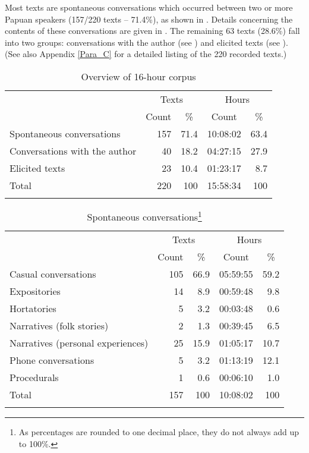 {Most texts are spontaneous conversations which occurred between two or more Papuan speakers (157/220 texts – 71.4\%), as shown in . Details concerning the contents of these conversations are given in . The remaining 63 texts (28.6\%) fall into two groups: conversations with the author (see ) and elicited texts (see ). (See also Appendix \ref{Para_C} for a detailed listing of the 220 recorded texts.)

\begin{table}[p]
\caption{Overview of 16-hour corpus}\label{Table_1.1.14}


\begin{tabular}{lrrrr}
\lsptoprule
 \multicolumn{1}{c}{Text types} & \multicolumn{2}{c}{Texts} & \multicolumn{2}{c}{Hours}\\\cmidrule(lr){2-3}\cmidrule(lr){4-5}
 & \multicolumn{1}{c}{Count} & \multicolumn{1}{c}{\%} & \multicolumn{1}{c}{Count} & \multicolumn{1}{c}{\%}\\
\midrule

Spontaneous conversations &  157 &  71.4 &  10:08:02 &  63.4\\
Conversations with the author &  40 &  18.2 &  04:27:15 &  27.9\\
Elicited texts &  23 &  10.4 &  01:23:17 &  8.7\\
\midrule
Total &  220 &  100 &  15:58:34 &  100\\

\lspbottomrule
\end{tabular}
\end{table}



\begin{table}[p]
\caption[Spontaneous conversations]{Spontaneous conversations\footnote{As percentages are rounded to one decimal place, they do not always add up to 100\%.}}\label{Table_1.15}

\begin{tabular}{lrrrr}
\lsptoprule
\multicolumn{1}{c}{Contents} & \multicolumn{2}{c}{Texts} & \multicolumn{2}{c}{Hours}\\\cmidrule(lr){2-3}\cmidrule(lr){4-5}
& \multicolumn{1}{c}{Count} & \multicolumn{1}{c}{\%} & \multicolumn{1}{c}{Count} & \multicolumn{1}{c}{\%} \\
\midrule
Casual conversations &  105 &  66.9 & 05:59:55 &  59.2\\
Expositories &  14 &  8.9 &  00:59:48 &  9.8\\
Hortatories &  5 &  3.2 &  00:03:48 &  0.6\\
Narratives (folk stories) &  2 &  1.3 &  00:39:45 &  6.5\\
Narratives (personal experiences) &  25 &  15.9 &  01:05:17 &  10.7\\
Phone conversations &  5 &  3.2 &  01:13:19 &  12.1\\
Procedurals &  1 &  0.6 &  00:06:10 &  1.0\\
\midrule
Total &  157 &  100 &  10:08:02 &  100\\
\lspbottomrule
\end{tabular}


\end{table}}
